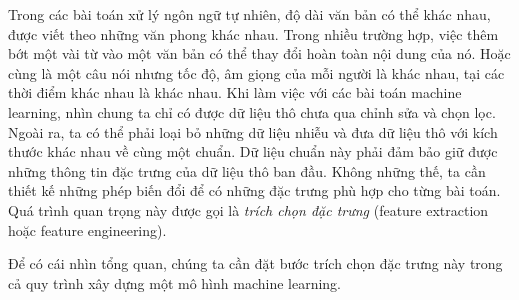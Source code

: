 Trong các bài toán xử lý ngôn ngữ tự nhiên, độ dài văn bản có thể khác nhau, được viết theo những văn phong khác nhau. Trong nhiều trường hợp, việc thêm bớt một vài từ vào một văn bản có thể thay đổi hoàn toàn nội dung của nó. Hoặc
cùng là một câu nói nhưng tốc độ, âm giọng của mỗi người là khác nhau, tại
các thời điểm khác nhau là khác nhau.
Khi làm việc với các bài toán machine learning, nhìn chung ta chỉ có được dữ
liệu thô chưa qua chỉnh sửa và chọn lọc. Ngoài ra, ta có thể phải loại bỏ những
dữ liệu nhiễu và đưa dữ liệu thô với kích thước khác nhau về cùng một chuẩn. Dữ
liệu chuẩn này phải đảm bảo giữ được những thông tin đặc trưng của dữ liệu
thô ban đầu. Không những thế, ta cần thiết kế những phép
biến đổi để có những đặc trưng phù hợp cho từng bài toán. Quá trình quan trọng này được gọi là \textit{trích chọn đặc trưng} ({feature extraction} hoặc {feature engineering}).



Để có cái nhìn tổng quan, chúng ta cần đặt bước trích chọn đặc trưng này trong cả quy trình xây dựng một mô hình machine learning.



